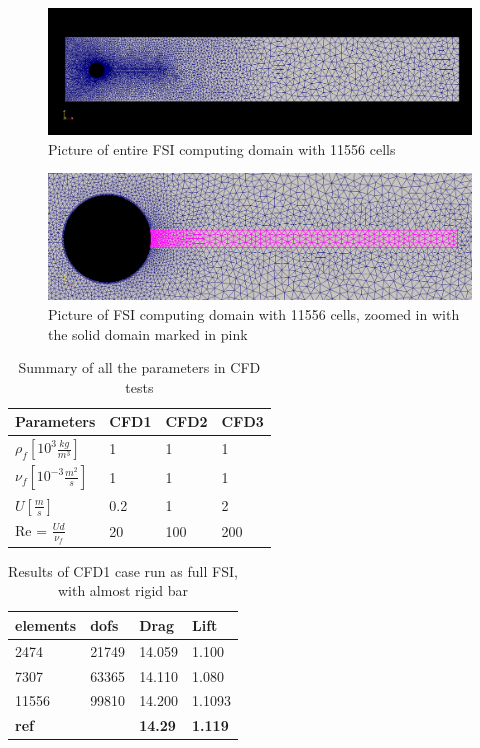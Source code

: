 \begin{figure}[H]
\centering
\caption{Picture of entire FSI computing domain with 11556 cells}
\includegraphics[scale=0.40,trim={20mm 34mm 20mm 30mm},clip]{./Verification_Validation/Hron_Turek/FSI_domain_b2.png}
\end{figure}
\begin{figure}[H]
\centering
\caption{Picture of FSI computing domain with 11556 cells, zoomed in with the solid domain marked in pink}
\includegraphics[scale=0.362,trim={0mm 0mm 0mm 0mm},clip]{./Verification_Validation/Hron_Turek/FSI_domain_b2_zoom.png}
\end{figure}


\vspace{1cm}

\begin{table}[H]
\centering
\caption{Summary of all the parameters in CFD tests}
\label{my-label}
\begin{tabular}{|l|l|l|l|}
\hline
Parameters & CFD1 & CFD2 & CFD3 \\ \hline
$\rho_f [10^3 \frac{kg}{m^3}]$ & 1 & 1 & 1 \\ \hline
$\nu_f [10^{-3} \frac{m^2}{s}]$ & 1 & 1 & 1 \\ \hline
$ U [\frac{m}{s}] $ & 0.2 & 1 & 2 \\ \hline
Re = $\frac{Ud}{\nu_f}$ & 20 & 100 & 200 \\ \hline
\end{tabular}
\end{table}

\begin{table}[H]
\centering
\caption{Results of CFD1 case run as full FSI, with almost rigid bar}
\label{my-label}
\begin{tabular}{|l|l|l|l|}
\hline
\textbf{elements} & \textbf{dofs} & \textbf{Drag} & \textbf{Lift} \\ \hline
2474 & 21749 & 14.059 & 1.100 \\ \hline
7307 & 63365 & 14.110 & 1.080 \\ \hline
11556 & 99810 & 14.200 & 1.1093 \\ \hline
\textbf{ref} & \textbf{} & \textbf{14.29} & \textbf{1.119} \\ \hline
\end{tabular}
\end{table}

